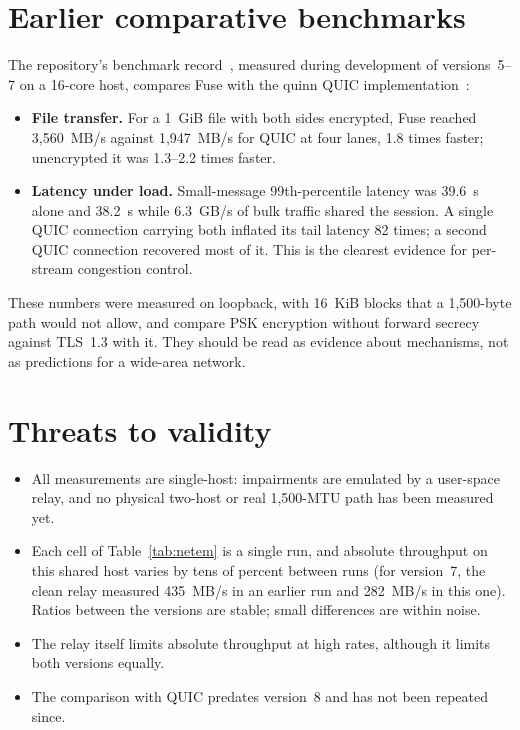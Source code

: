 \section{Earlier comparative benchmarks}

The repository's benchmark record~\cite{repo}, measured during development of versions~5--7 on a 16-core host,
compares Fuse with the quinn QUIC implementation~\cite{quinn}:
\begin{itemize}
  \item \textbf{File transfer.} For a 1~GiB file with both sides encrypted, Fuse reached 3,560~MB/s against
    1,947~MB/s for QUIC at four lanes, 1.8 times faster; unencrypted it was 1.3--2.2 times faster.
  \item \textbf{Latency under load.} Small-message 99th-percentile latency was 39.6~\textmu s alone and
    38.2~\textmu s while 6.3~GB/s of bulk traffic shared the session. A single QUIC connection carrying both
    inflated its tail latency 82 times; a second QUIC connection recovered most of it. This is the clearest
    evidence for per-stream congestion control.
\end{itemize}
These numbers were measured on loopback, with 16~KiB blocks that a 1,500-byte path would not allow, and compare
PSK encryption without forward secrecy against TLS~1.3 with it. They should be read as evidence about
mechanisms, not as predictions for a wide-area network.

\section{Threats to validity}

\begin{itemize}
  \item All measurements are single-host: impairments are emulated by a user-space relay, and no physical
    two-host or real 1,500-MTU path has been measured yet.
  \item Each cell of Table~\ref{tab:netem} is a single run, and absolute throughput on this shared host varies
    by tens of percent between runs (for version~7, the clean relay measured 435~MB/s in an earlier run and
    282~MB/s in this one). Ratios between the versions are stable; small differences are within noise.
  \item The relay itself limits absolute throughput at high rates, although it limits both versions equally.
  \item The comparison with QUIC predates version~8 and has not been repeated since.
\end{itemize}
